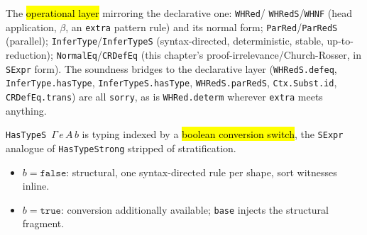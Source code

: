 \begin{definition}
\label{family:expb-sexpr-operational}
\leanok
{}

 The \hl{operational layer} mirroring the declarative one: \texttt{WHRed}/%
\texttt{WHRedS}/\texttt{WHNF} (head application, $\beta$, an \texttt{extra} pattern rule) and its
normal form; \texttt{ParRed}/\texttt{ParRedS} (parallel); \texttt{InferType}/\texttt{InferTypeS}
(syntax-directed, deterministic, stable, up-to-reduction); \texttt{NormalEq}/\texttt{CRDefEq} (this
chapter's proof-irrelevance/Church-Rosser, in \texttt{SExpr} form).
 The soundness bridges to the declarative layer (\texttt{WHRedS.defeq},
\texttt{InferType.hasType}, \texttt{InferTypeS.hasType}, \texttt{WHRedS.parRedS},
\texttt{Ctx.Subst.id}, \texttt{CRDefEq.trans}) are all \texttt{sorry}, as is \texttt{WHRed.determ}
wherever \texttt{extra} meets anything.
\end{definition}

\begin{definition}
\label{inductive:expb-hastypes}
\leanok
{}

 \texttt{HasTypeS}~$\Gamma\,e\,A\,b$ is typing indexed by a \hl{boolean conversion
switch}, the \texttt{SExpr} analogue of \texttt{HasTypeStrong} stripped of stratification.
\begin{itemize}
\item $b=\mathtt{false}$: structural, one syntax-directed rule per shape, sort witnesses inline.
\item $b=\mathtt{true}$: conversion additionally available; \texttt{base} injects the structural
fragment.
\end{itemize}
\end{definition}

